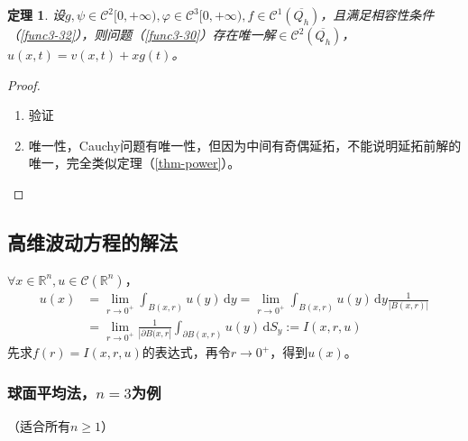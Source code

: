 \documentclass[11pt, a4paper]{article}
\theoremstyle{theorem}
\newtheorem{thm}{定理}[section]
\newcommand{\intd}[1]{\,\mathrm{d}{#1}}
\begin{document}
\begin{thm}
\label{thm-power2}
设$g,\psi \in \mathcal{C}^2 [0, + \infty), \varphi \in \mathcal{C}^3[0, +\infty), f \in \mathcal{C}^1(\overline{Q_h})$，且满足相容性条件（\ref{func3-32}），则问题（\ref{func3-30}）存在唯一解$\in \mathcal{C}^2(\overline{Q_h})$，$u(x,t) = v(x,t) + xg(t)$。
\end{thm}

\begin{proof}
\begin{enumerate}[(1)]
  \item 验证
  \item 唯一性，Cauchy问题有唯一性，但因为中间有奇偶延拓，不能说明延拓前解的唯一，完全类似定理（\ref{thm-power}）。
\end{enumerate}
\end{proof}

\subsection{高维波动方程的解法}

$\forall x \in \mathbb{R}^n, u \in \mathcal{C}(\mathbb{R}^n)$，
  \begin{align*}
      u(x) &= \lim_{r \rightarrow 0^+} \int_{B(x,r)} u(y) \intd y = \lim_{r \rightarrow 0^+} \int_{B(x,r)} u(y) \intd y \frac{1}{|B(x,r)|} \\
      &= \lim_{r \rightarrow 0^+} \frac{1}{|\partial B(x,r|} \int_{\partial B(x,r)} u(y) \intd S_y := I(x,r,u)
  \end{align*}
  先求$f(r) = I(x,r,u)$的表达式，再令$r \rightarrow 0^+$，得到$u(x)$。

\subsubsection{球面平均法，$n=3$为例}（适合所有$n \geq 1$）
\end{document}
